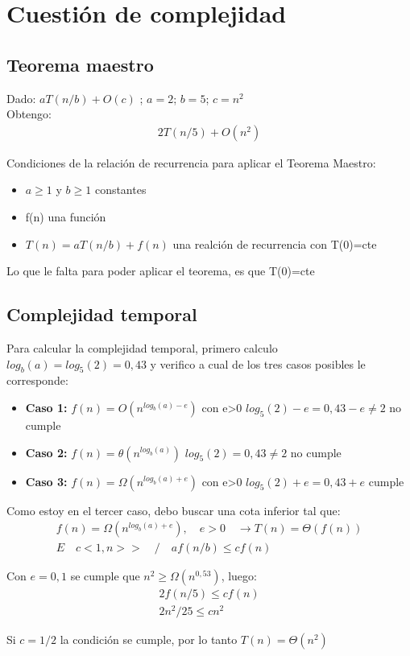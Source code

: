 \documentclass[titlepage,a4paper]{article}
\begin{document}
\newpage
\section{Cuestión de complejidad}

\subsection{Teorema maestro}
Dado:  $a T(n/b) + O(c)$ ; $a=2$; $b=5$; $c=n^2$ \\
Obtengo:
\begin{align*} 
2T(n/5)+O(n^2)
\end{align*}

Condiciones de la relación de recurrencia para aplicar el Teorema Maestro:
\begin{itemize}
    \item $a\geq 1$ y $b \geq 1$ constantes
    \item f(n) una función
    \item $T(n)=a T(n/b) + f(n)$ una realción de recurrencia con T(0)=cte
\end{itemize}

Lo que le falta para poder aplicar el teorema, es que T(0)=cte


\subsection{Complejidad temporal}

Para calcular la complejidad temporal, primero calculo $log_b(a)=log_5(2)=0,43$ y verifico a cual de los tres casos posibles le corresponde:
\begin{itemize}
    \item \textbf{Caso 1:} $f(n)=O(n^{log_b(a)-e})$ con e>0 \qquad $log_5(2)-e=0,43-e \neq 2$ \quad no cumple  
    \item \textbf{Caso 2:} $f(n)=\theta(n^{log_b(a)})$ \qquad $log_5(2)=0,43 \neq 2$ \quad no cumple   
    \item \textbf{Caso 3:}  $f(n)=\Omega(n^{log_b(a)+e})$ con e>0 \qquad $log_5(2)+e=0,43+e$ \quad cumple
\end{itemize}

Como estoy en el tercer caso, debo buscar una cota inferior tal que:
\begin{align*} 
    f(n)=\Omega(n^{log_b(a)+e}), \quad e>0 \quad \rightarrow  T(n)=\Theta(f(n)) \\
    E \quad c<1, n>> \quad / \quad af(n/b) \leq cf(n)
\end{align*}

Con $e=0,1$ se cumple que $n^2\geq\Omega(n^{0,53})$, luego:
\begin{align*}
     2f(n/5) \leq cf(n) \\
     2n^2/25 \leq cn^2
\end{align*}

Si $c=1/2$ la condición se cumple, por lo tanto $ T(n)=\Theta(n^2) $
\end{document}
